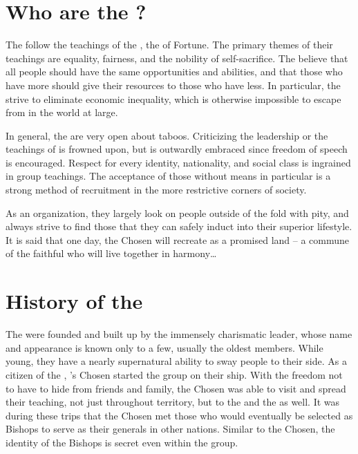 \documentclass[blue]{GL2020}
\begin{document}
\name{\bCult{}}

\section*{Who are the \pGoaties{}?}
The \pGoaties{} follow the teachings of the \cGenesis{\Deity} \cGenesis{}, the \cGenesis{\Deity} of Fortune. The primary themes of their teachings are equality, fairness, and the nobility of self-sacrifice. The \pGoaties{} believe that all people should have the same opportunities and abilities, and that those who have more should give their resources to those who have less. In particular, the \pGoaties{} strive to eliminate economic inequality, which is otherwise impossible to escape from in the world at large.

In general, the \pGoaties{} are very open about taboos. Criticizing the leadership or the teachings of \cGenesis{} is frowned upon, but is outwardly embraced since freedom of speech is encouraged. Respect for every identity, nationality, and social class is ingrained in group teachings. The acceptance of those without means in particular is a strong method of recruitment in the more restrictive corners of society.

As an organization, they largely look on people outside of the fold with pity, and always strive to find those that they can safely induct into their superior lifestyle. It is said that one day, the Chosen will recreate \pEarth{} as a promised land -- a commune of the faithful who will live together in harmony\ldots

\section*{History of the \pGoaties{}}
The \pGoaties{} were founded and built up by the immensely charismatic leader, whose name and appearance is known only to a few, usually the oldest members. While young, they have a nearly supernatural ability to sway people to their side. As a citizen of the \pShip{}, \cGenesis{}’s Chosen started the group on their ship. With the freedom not to have to hide from friends and family, the Chosen was able to visit and spread their teaching, not just throughout \pShip{} territory, but to the \pTech{} and the \pFarm{} as well. It was during these trips that the Chosen met those who would eventually be selected as Bishops to serve as their generals in other nations. Similar to the Chosen, the identity of the Bishops is secret even within the group.
\end{document}
